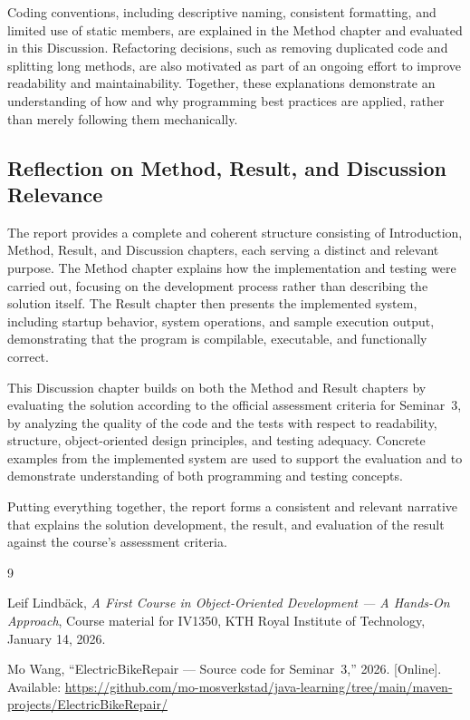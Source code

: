 \documentclass[a4paper]{scrartcl}
\begin{document}
Coding conventions, including descriptive naming, consistent formatting, and limited use of static members, are explained in the Method chapter and evaluated in this Discussion. Refactoring decisions, such as removing duplicated code and splitting long methods, are also motivated as part of an ongoing effort to improve readability and maintainability. Together, these explanations demonstrate an understanding of how and why programming best practices are applied, rather than merely following them mechanically.

\subsection{Reflection on Method, Result, and Discussion Relevance}

The report provides a complete and coherent structure consisting of Introduction, Method, Result, and Discussion chapters, each serving a distinct and relevant purpose. The Method chapter explains how the implementation and testing were carried out, focusing on the development process rather than describing the solution itself. The Result chapter then presents the implemented system, including startup behavior, system operations, and sample execution output, demonstrating that the program is compilable, executable, and
functionally correct.

This Discussion chapter builds on both the Method and Result chapters by evaluating the solution according to the official assessment criteria for Seminar~3, by analyzing the quality of the code and the tests with respect to readability, structure, object-oriented design principles, and testing adequacy. Concrete examples from the implemented system are used to support the evaluation and to demonstrate understanding of both programming and testing concepts.

Putting everything together, the report forms a consistent and relevant narrative that explains the solution development, the result, and evaluation of the result against the course's assessment criteria.

\begin{thebibliography}{9}

Leif Lindbäck,
\textit{A First Course in Object-Oriented Development --- A Hands-On Approach},
Course material for IV1350,
KTH Royal Institute of Technology,
January 14, 2026.

Mo Wang,
``ElectricBikeRepair --- Source code for Seminar~3,''
2026.
[Online]. Available: \url{https://github.com/mo-mosverkstad/java-learning/tree/main/maven-projects/ElectricBikeRepair/}

\end{thebibliography}
\end{document}
